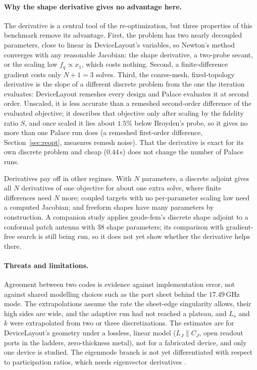 \documentclass{anvil-paper}
\begin{document}
\paragraph{Why the shape derivative gives no advantage here.}
The derivative is a central tool of the re-optimization, but three
properties of this benchmark remove its advantage. First, the problem has
two nearly decoupled parameters, close to linear in DeviceLayout's
variables, so Newton's method converges with any reasonable Jacobian: the
shape derivative, a two-probe secant, or the scaling law $f_q \propto x_1$,
which costs nothing. Second, a finite-difference gradient costs only $N+1 =
3$ solves. Third, the coarse-mesh, fixed-topology derivative is the slope
of a different discrete problem from the one the iteration evaluates:
DeviceLayout remeshes every design and Palace evaluates it at second
order. Unscaled, it is less accurate than a remeshed second-order
difference of the evaluated objective; it describes that objective only
after scaling by the fidelity ratio $S$, and once scaled it lies about
$1.5\%$ below Broyden's probe, so it gives no more than one Palace run
does (a remeshed first-order difference, Section~\ref{sec:reopt}, measures
remesh noise). That the
derivative is exact for its own discrete problem and cheap ($0.44$\,s)
does not change the number of Palace runs.

Derivatives pay off in other regimes. With $N$ parameters, a discrete
adjoint gives all $N$ derivatives of one objective for about one extra
solve, where finite differences need $N$ more; coupled targets with no
per-parameter scaling law need a computed Jacobian; and freeform shapes
have many parameters by construction. A companion study
\citep{walters2026conformal} applies geode-fem's discrete shape adjoint to
a conformal patch antenna with 38 shape parameters; its comparison with
gradient-free search is still being run, so it does not yet show whether
the derivative helps there.

\paragraph{Threats and limitations.}
Agreement between two codes is evidence against implementation error, not
against shared modelling choices such as the port sheet behind the
$17.49$\,GHz mode. The extrapolations assume the rate the sheet-edge singularity
allows, their high sides are wide, and the adaptive run had not reached a
plateau, and $L_s$ and $k$ were extrapolated from two or three
discretizations. The estimates are for DeviceLayout's geometry
under a lossless, linear model ($L_J \parallel C_J$, open readout ports in
the ladders, zero-thickness metal), not for a fabricated device, and only
one device is studied. The eigenmode branch is
not yet differentiated with respect to participation ratios, which needs
eigenvector derivatives \citep{nelson1976simplified}.
\end{document}
